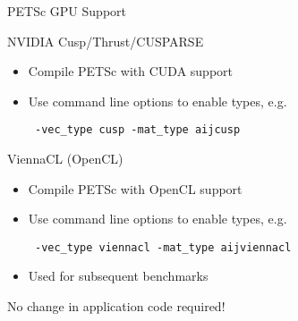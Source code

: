 \begin{frame}[fragile]{PETSc GPU Support}
 
  \begin{block}{NVIDIA Cusp/Thrust/CUSPARSE}
   \begin{itemize}
   \item Compile PETSc with CUDA support
   \item Use command line options to enable types, e.g.
    \begin{lstlisting}
 -vec_type cusp -mat_type aijcusp
    \end{lstlisting}
  \end{itemize}
  \end{block}

  \begin{block}{ViennaCL (OpenCL)}
  \begin{itemize}
   \item Compile PETSc with OpenCL support
   \item Use command line options to enable types, e.g.
    \begin{lstlisting}
 -vec_type viennacl -mat_type aijviennacl
    \end{lstlisting}
   \item Used for subsequent benchmarks
  \end{itemize}
  \end{block}

 \begin{center} No change in application code required! \end{center}
                                                        
\end{frame}


